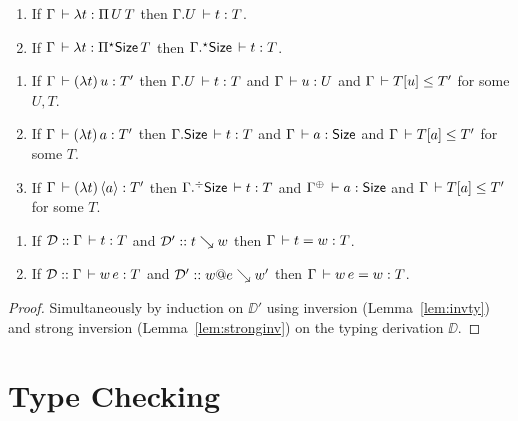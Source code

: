 \documentclass[acmlarge,review,anonymous]{acmart}\settopmatter{printfolios=true}
\begin{document}
\begin{lemma}
  \label{lem:invabs}
  \bla
  \begin{enumerate}
  \item   If $\Gamma \,\vdash \lambda t : \Pi\,U\, T$ then
  $\Gamma. U \,\vdash t : T$.
  \item   If $\Gamma \,\vdash \lambda t : \Pi{}^{\mathord{\star}}\mathsf{Size}\, T$ then
  $\Gamma.{}^{\mathord{\star}}\mathsf{Size} \,\vdash t : T$.
  \end{enumerate}
\end{lemma}

\begin{lemma}
  \label{lem:stronginv}
  \bla
  \begin{enumerate}
  \item   If $\Gamma \,\vdash (\lambda t)\,u : T'$ then
  $\Gamma. U \,\vdash t : T$ and $\Gamma \,\vdash u : U$ and $\Gamma \,\vdash T[u] \leq T'$
  for some $U,T$.
  \item   If $\Gamma \,\vdash (\lambda t)\,a : T'$ then
  $\Gamma. \mathsf{Size} \,\vdash t : T$ and $\Gamma \,\vdash a : \mathsf{Size}$ and $\Gamma \,\vdash T[a] \leq T'$
  for some $T$.
  \item   If $\Gamma \,\vdash (\lambda t)\,\langle a\rangle : T'$ then
  $\Gamma.{}^{\mathord{\div}}\mathsf{Size} \,\vdash t : T$ and $\resurrect \Gamma \der a : \Size$ and $\Gamma \,\vdash T[a] \leq T'$
  for some $T$.
  \end{enumerate}
\end{lemma}

\begin{theorem}
  \label{thm:sr}
  \bla
  \begin{enumerate}
  \item
  If $\mathcal{D} :: \Gamma \,\vdash t : T$ and $\mathcal{D}' :: t \searrow w$ then $\Gamma \,\vdash t = w : T$.
  \item
  If $\mathcal{D} :: \Gamma \,\vdash w\, e : T$ and $\mathcal{D}' :: w @ e \searrow w'$ then $\Gamma \,\vdash w\,e = w : T$.
  \end{enumerate}
\end{theorem}
\begin{proof}
  Simultaneously by induction on $\DD'$
  using inversion (Lemma~\ref{lem:invty}) and strong inversion (Lemma~\ref{lem:stronginv})
  on the typing derivation $\DD$. %
\end{proof}

\section{Type Checking}
\label{sec:tycheck}
\end{document}
